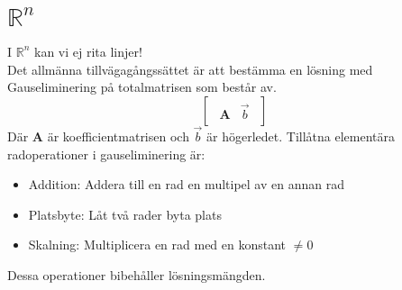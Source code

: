 \section{$\mathbb{R}^n$} %
\label{sec: R^n}
I $\mathbb{R}^n$ kan vi ej rita linjer!\\
Det allmänna tillvägagångssättet är att bestämma en lösning med Gauseliminering på totalmatrisen som består av.
\[
    \begin{bmatrix}
    \begin{array}{c|c}
    	\mathbf{A} & \vec{b}
    \end{array}
    \end{bmatrix}
\]
Där \textbf{A} är koefficientmatrisen och $\vec{b}$ är högerledet.
Tillåtna elementära radoperationer i gauseliminering är:
\begin{itemize}
	\item Addition: Addera till en rad en multipel av en annan rad
	\item Platsbyte: Låt två rader byta plats
	\item Skalning: Multiplicera en rad med en konstant $\neq 0$
\end{itemize}
Dessa operationer bibehåller lösningsmängden.

